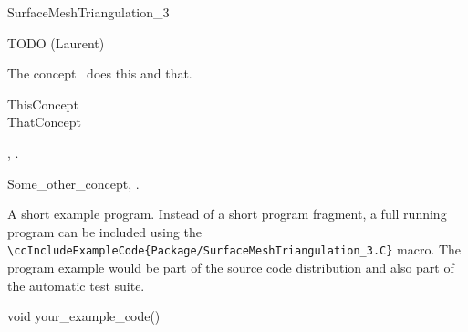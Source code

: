 

\begin{ccRefConcept}{SurfaceMeshTriangulation_3}


\ccDefinition

TODO (Laurent)

The concept \ccRefName\ does this and that.

\ccGeneralizes

ThisConcept \\
ThatConcept

\ccTypes


\ccCreation
{}  %


\ccOperations


\ccHasModels

,
.

\ccSeeAlso

Some\_other\_concept,
.

\ccExample

A short example program.
Instead of a short program fragment, a full running program can be
included using the 
\verb|\ccIncludeExampleCode{Package/SurfaceMeshTriangulation_3.C}| 
macro. The program example would be part of the source code distribution and
also part of the automatic test suite.

\begin{ccExampleCode}
void your_example_code() {
}
\end{ccExampleCode}


\end{ccRefConcept}


